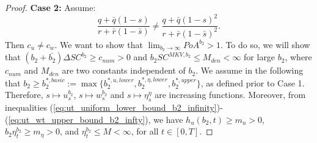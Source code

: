 \documentclass[11pt]{article}
\begin{document}
\begin{proof}
	\textbf{Case 2:} Assume:
	\begin{equation*}
	\frac{q+\bar{q}(1-s)}{r+\bar{r}(1-\bar{s})} \neq \frac{q+\bar{q}(1-s)^2}{r+\bar{r}(1-\bar{s})^2}.
	\end{equation*}
	Then $c_u \neq c_w$. We want to show that $\lim_{b_2 \to \infty}PoA^{b_2}>1$. To do so, we will show that $(b_2 + \bar{b_2}) \Delta SC^{b_2}\geq c_{num}>0$ and $b_2 SC^{MKV,b_2} \leq M_{den}<\infty$ for large $b_2$, where $c_{num}$ and $M_{den}$ are two constants independent of $b_2$. We assume in the following that $b_2 \geq b_2^{*,basic} := \max \{b_2^{*,u,lower}, b_2^{*,\eta,lower}, b_2^{*,upper} \}$, as defined prior to Case 1. Therefore, $s \mapsto u_s^{b_2}$, $s \mapsto w_s^{b_2}$ and $s \mapsto \eta_s^{\eta}$ are increasing functions. Moreover, from inequalities (\ref{eq:ut_uniform_lower_bound_b2_infinity})-(\ref{eq:ut_wt_upper_bound_b2_infty}), we have $h_u(b_2,t) \geq m_u>0$, $b_2 \eta_t^{b_2} \geq m_\eta>0$, and $\eta_t^{b_2} \leq M<\infty$, for all $t\in[0,T]$.
	

\end{proof}
\end{document}

